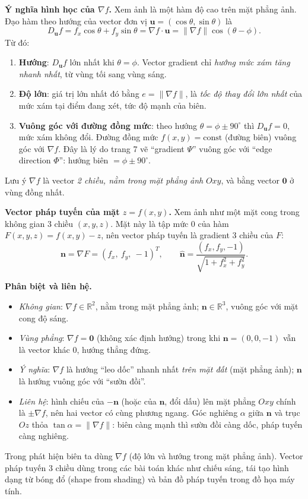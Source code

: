 \textbf{Ý nghĩa hình học của $\nabla f$.} Xem ảnh là một hàm độ cao trên mặt phẳng ảnh. Đạo hàm theo hướng của vector đơn vị $\mathbf{u} = (\cos\theta, \sin\theta)$ là
\begin{equation}
D_{\mathbf{u}} f = f_x\cos\theta + f_y\sin\theta = \nabla f \cdot \mathbf{u} = \|\nabla f\|\cos(\theta - \phi).
\end{equation}
Từ đó:
\begin{enumerate}
    \item \textbf{Hướng}: $D_{\mathbf{u}} f$ lớn nhất khi $\theta = \phi$. Vector gradient chỉ \emph{hướng mức xám tăng nhanh nhất}, từ vùng tối sang vùng sáng.
    \item \textbf{Độ lớn}: giá trị lớn nhất đó bằng $e = \|\nabla f\|$, là \emph{tốc độ thay đổi lớn nhất} của mức xám tại điểm đang xét, tức độ mạnh của biên.
    \item \textbf{Vuông góc với đường đồng mức}: theo hướng $\theta = \phi \pm 90^\circ$ thì $D_{\mathbf{u}} f = 0$, mức xám không đổi. Đường đồng mức $f(x, y) = \text{const}$ (đường biên) vuông góc với $\nabla f$. Đây là lý do trang 7 vẽ ``gradient $\Psi$'' vuông góc với ``edge direction $\Phi$'': hướng biên $= \phi \pm 90^\circ$.
\end{enumerate}
Lưu ý $\nabla f$ là vector \emph{2 chiều, nằm trong mặt phẳng ảnh} $Oxy$, và bằng vector $\mathbf{0}$ ở vùng đồng nhất.

\textbf{Vector pháp tuyến của mặt $z = f(x, y)$.} Xem ảnh như một mặt cong trong không gian 3 chiều $(x, y, z)$. Mặt này là tập mức $0$ của hàm $F(x, y, z) = f(x, y) - z$, nên vector pháp tuyến là gradient 3 chiều của $F$:
\begin{equation}
\mathbf{n} = \nabla F = (f_x,\ f_y,\ -1)^T, \qquad \hat{\mathbf{n}} = \frac{(f_x, f_y, -1)}{\sqrt{1 + f_x^2 + f_y^2}}.
\end{equation}

\textbf{Phân biệt và liên hệ.}
\begin{itemize}
    \item \emph{Không gian}: $\nabla f \in \mathbb{R}^2$, nằm trong mặt phẳng ảnh; $\mathbf{n} \in \mathbb{R}^3$, vuông góc với mặt cong độ sáng.
    \item \emph{Vùng phẳng}: $\nabla f = \mathbf{0}$ (không xác định hướng) trong khi $\mathbf{n} = (0, 0, -1)$ vẫn là vector khác $0$, hướng thẳng đứng.
    \item \emph{Ý nghĩa}: $\nabla f$ là hướng ``leo dốc'' nhanh nhất \emph{trên mặt đất} (mặt phẳng ảnh); $\mathbf{n}$ là hướng vuông góc với ``sườn đồi''.
    \item \emph{Liên hệ}: hình chiếu của $-\mathbf{n}$ (hoặc của $\mathbf{n}$, đổi dấu) lên mặt phẳng $Oxy$ chính là $\pm\nabla f$, nên hai vector có cùng phương ngang. Góc nghiêng $\alpha$ giữa $\mathbf{n}$ và trục $Oz$ thỏa $\tan\alpha = \|\nabla f\|$: biên càng mạnh thì sườn đồi càng dốc, pháp tuyến càng nghiêng.
\end{itemize}
Trong phát hiện biên ta dùng $\nabla f$ (độ lớn và hướng trong mặt phẳng ảnh). Vector pháp tuyến 3 chiều dùng trong các bài toán khác như chiếu sáng, tái tạo hình dạng từ bóng đổ (shape from shading) và bản đồ pháp tuyến trong đồ họa máy tính.

